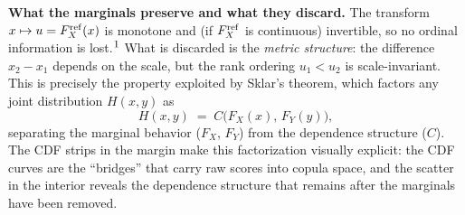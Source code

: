\documentclass[10pt]{article}
\begin{document}
\begin{minipage}[t]{7.8in}
\begin{minipage}{7.4in}
    \vspace{6pt}
    \textbf{What the marginals preserve and what they discard.}\enspace
    The transform $x \mapsto u = F_X^{\mathrm{ref}}(x)$ is monotone and (if $F_X^{\mathrm{ref}}$ is
    continuous) invertible, so no ordinal information is lost.$^{\mbox{\footnotesize{1}}}$
    What is discarded is the \emph{metric structure}: the difference
    $x_2 - x_1$ depends on the scale, but the rank ordering
    $u_1 < u_2$ is scale-invariant. This is precisely the property exploited by
    Sklar's theorem, which factors any joint distribution $H(x,y)$ as
    \begin{equation}
      H(x,y) \;=\; C\bigl(F_X(x),\, F_Y(y)\bigr),
      \tag{M.4}
    \end{equation}
    separating the marginal behavior ($F_X$, $F_Y$) from the dependence
    structure ($C$). The CDF strips in the margin make this factorization
    visually explicit: the CDF curves are the ``bridges'' that carry raw scores
    into copula space, and the scatter in the interior reveals the dependence
    structure that remains after the marginals have been removed.

  \end{minipage}
  \vspace{0.1in}
\end{minipage}
\end{document}
